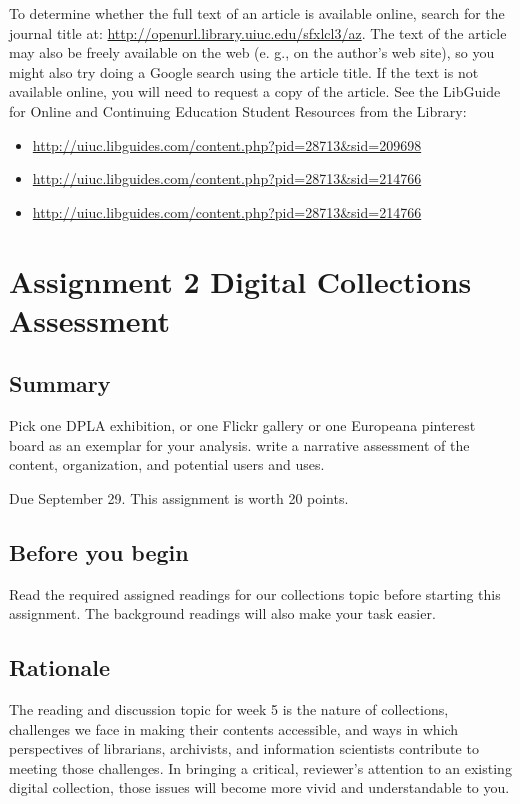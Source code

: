 \documentclass[]{article}
\providecommand{\tightlist}{%
  \setlength{\itemsep}{0pt}\setlength{\parskip}{0pt}}
\begin{document}
To determine whether the full text of an article is available online,
search for the journal title at:
\url{http://openurl.library.uiuc.edu/sfxlcl3/az}. The text of the
article may also be freely available on the web (e. g., on the author's
web site), so you might also try doing a Google search using the article
title. If the text is not available online, you will need to request a
copy of the article. See the LibGuide for Online and Continuing
Education Student Resources from the Library:

\begin{itemize}
\tightlist
\item
  \url{http://uiuc.libguides.com/content.php?pid=28713\&sid=209698}
\item
  \url{http://uiuc.libguides.com/content.php?pid=28713\&sid=214766}
\item
  \url{http://uiuc.libguides.com/content.php?pid=28713\&sid=214766}
\end{itemize}

\section{Assignment 2 Digital Collections Assessment}\label{Asgt2}

\subsection{Summary}\label{summary}

Pick one DPLA exhibition, or one Flickr gallery or one Europeana
pinterest board as an exemplar for your analysis. write a narrative
assessment of the content, organization, and potential users and uses.

Due September 29. This assignment is worth 20 points.

\subsection{Before you begin}\label{before-you-begin}

Read the required assigned readings for our collections topic before
starting this assignment. The background readings will also make your
task easier.

\subsection{Rationale}\label{rationale-1}

The reading and discussion topic for week 5 is the nature of
collections, challenges we face in making their contents accessible, and
ways in which perspectives of librarians, archivists, and information
scientists contribute to meeting those challenges. In bringing a
critical, reviewer's attention to an existing digital collection, those
issues will become more vivid and understandable to you.
\end{document}
